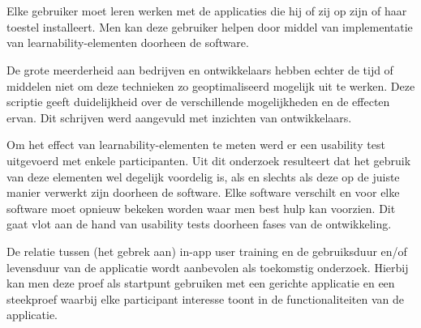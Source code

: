 


\chapter*{}

Elke gebruiker moet leren werken met de applicaties die hij of zij op zijn of haar toestel installeert. Men kan deze gebruiker helpen door middel van implementatie van learnability-elementen doorheen de software.

De grote meerderheid aan bedrijven en ontwikkelaars hebben echter de tijd of middelen niet om deze technieken zo geoptimaliseerd mogelijk uit te werken. Deze scriptie geeft duidelijkheid over de verschillende mogelijkheden en de effecten ervan. Dit schrijven werd aangevuld met inzichten van ontwikkelaars.

Om het effect van learnability-elementen te meten werd er een usability test uitgevoerd met enkele participanten. Uit dit onderzoek resulteert dat het gebruik van deze elementen wel degelijk voordelig is, als en slechts als deze op de juiste manier verwerkt zijn doorheen de software. Elke software verschilt en voor elke software moet opnieuw bekeken worden waar men best hulp kan voorzien. Dit gaat vlot aan de hand van usability tests doorheen fases van de ontwikkeling.

De relatie tussen (het gebrek aan) in-app user training en de gebruiksduur en/of levensduur van de applicatie wordt aanbevolen als toekomstig onderzoek. Hierbij kan men deze proef als startpunt gebruiken met een gerichte applicatie en een steekproef waarbij elke participant interesse toont in de functionaliteiten van de applicatie.
